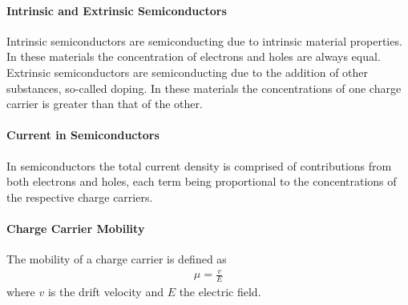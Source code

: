 \paragraph{Intrinsic and Extrinsic Semiconductors}
Intrinsic semiconductors are semiconducting due to intrinsic material properties. In these materials the concentration of electrons and holes are always equal. Extrinsic semiconductors are semiconducting due to the addition of other substances, so-called doping. In these materials the concentrations of one charge carrier is greater than that of the other.

\paragraph{Current in Semiconductors}
In semiconductors the total current density is comprised of contributions from both electrons and holes, each term being proportional to the concentrations of the respective charge carriers.

\paragraph{Charge Carrier Mobility}
The mobility of a charge carrier is defined as
\begin{align*}
	\mu = \frac{v}{E}
\end{align*}
where $v$ is the drift velocity and $E$ the electric field.

